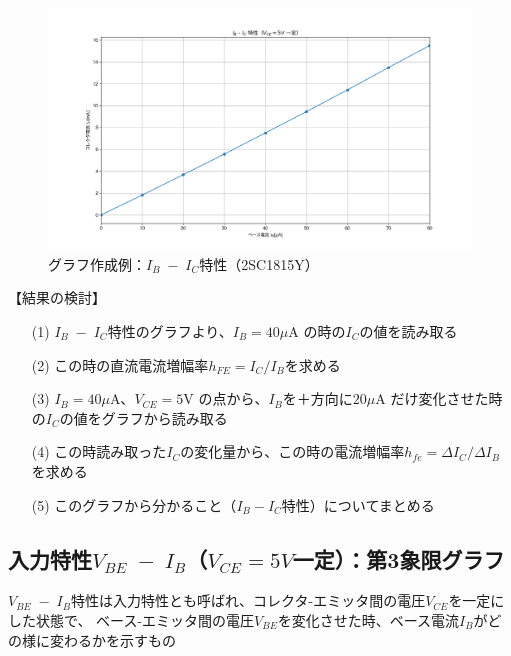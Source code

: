 \documentclass[uplatex,a4paper,11pt,oneside,openany]{jsbook}
\begin{document}
\begin{figure}[H]
  \centering
   \includegraphics[keepaspectratio, scale=0.45, angle=0]
               {figs/png/x2static.png}
               \caption{グラフ作成例：$I_B\;-\;I_C$特性（2SC1815Y）}
               \label{fig:iocharM1Yd}
\end{figure}

【結果の検討】

\begin{enumerate}
\item[(1)] $I_B\;-\;I_C$特性のグラフより、$I_B=40\mu$A の時の$I_C$の値を読み取る\\
\item[(2)] この時の直流電流増幅率$h_{FE}=I_C/I_B$を求める\\
\item[(3)] $I_B=40\mu$A、$V_{CE}=5$V の点から、$I_B$を＋方向に$20\mu$A だけ変化させた時の$I_C$の値をグラフから読み取る\\
\item[(4)] この時読み取った$I_C$の変化量から、この時の電流増幅率$h_{fe}=\Delta I_C/\Delta I_B$を求める\\
\item[(5)] このグラフから分かること（$I_B-I_C$特性）についてまとめる
\end{enumerate}

\newpage

\subsection{入力特性$V_{BE}\;-\;I_B$（$V_{CE}=5V$一定）：第3象限グラフ}

$V_{BE}\;-\;I_B$特性は入力特性とも呼ばれ、コレクタ-エミッタ間の電圧$V_{CE}$を一定にした状態で、
ベース-エミッタ間の電圧$V_{BE}$を変化させた時、ベース電流$I_B$がどの様に変わるかを示すもの
\end{document}
